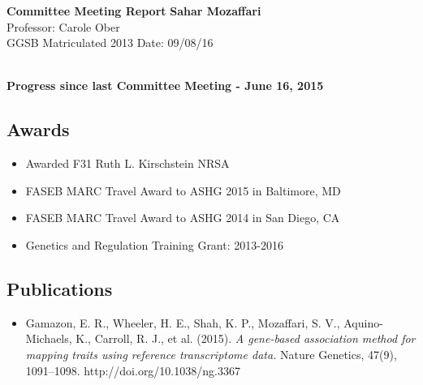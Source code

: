 \documentclass[a4paper, 11pt]{article}
\begin{document}
\noindent
\large\textbf{Committee Meeting Report} \hfill \textbf{Sahar Mozaffari} \\
\normalsize  \hfill Professor: Carole Ober  \\
GGSB Matriculated 2013 \hfill Date: 09/08/16 \\
\noindent\makebox[\linewidth]{\rule{\paperwidth}{0.4pt}}

\large\textbf{\\Progress since last Committee Meeting - June 16, 2015}
\subsection*{Awards}
\begin{itemize}
    \item Awarded F31 Ruth L. Kirschstein NRSA 
    \item FASEB MARC Travel Award to ASHG 2015 in Baltimore, MD
    \item FASEB MARC Travel Award to ASHG 2014 in San Diego, CA
    \item Genetics and Regulation Training Grant: 2013-2016
\end{itemize} 

\subsection*{Publications}
\begin{itemize}
    \item Gamazon, E. R., Wheeler, H. E., Shah, K. P., Mozaffari, S. V., Aquino-Michaels, K., Carroll, R. J., et al. (2015). \emph{A gene-based association method for mapping traits using reference transcriptome data.} Nature Genetics, 47(9), 1091–1098. http://doi.org/10.1038/ng.3367\cite{Gamazon}
\end{itemize}
\end{document}
